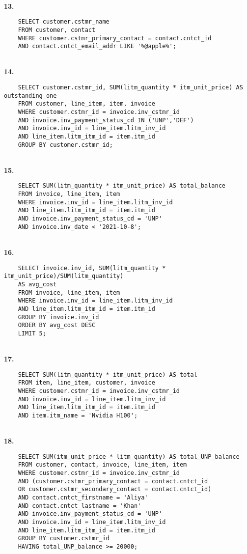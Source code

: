 \documentclass[letterpaper,11pt]{article}
\newcommand{\Paragraph}[1]{~\vspace*{-0.7\baselineskip}\\{\bf #1}}
\begin{document}
\Paragraph{13. }
\begin{verbatim}
	SELECT customer.cstmr_name
	FROM customer, contact
	WHERE customer.cstmr_primary_contact = contact.cntct_id
	AND contact.cntct_email_addr LIKE '%@apple%';
\end{verbatim}

\Paragraph{14.}
\begin{verbatim}
	SELECT customer.cstmr_id, SUM(litm_quantity * itm_unit_price) AS outstanding_one
	FROM customer, line_item, item, invoice
	WHERE customer.cstmr_id = invoice.inv_cstmr_id
	AND invoice.inv_payment_status_cd IN ('UNP','DEF')
	AND invoice.inv_id = line_item.litm_inv_id
	AND line_item.litm_itm_id = item.itm_id
	GROUP BY customer.cstmr_id;
\end{verbatim}

\Paragraph{15.}
\begin{verbatim}
	SELECT SUM(litm_quantity * itm_unit_price) AS total_balance
	FROM invoice, line_item, item
	WHERE invoice.inv_id = line_item.litm_inv_id
	AND line_item.litm_itm_id = item.itm_id
	AND invoice.inv_payment_status_cd = 'UNP'
	AND invoice.inv_date < '2021-10-8';
\end{verbatim}

\newpage
\Paragraph{16. }
\begin{verbatim}
	SELECT invoice.inv_id, SUM(litm_quantity * itm_unit_price)/SUM(litm_quantity) 
	AS avg_cost
	FROM invoice, line_item, item
	WHERE invoice.inv_id = line_item.litm_inv_id
	AND line_item.litm_itm_id = item.itm_id
	GROUP BY invoice.inv_id
	ORDER BY avg_cost DESC
	LIMIT 5;
\end{verbatim}

\Paragraph{17.}
\begin{verbatim}
	SELECT SUM(litm_quantity * itm_unit_price) AS total
	FROM item, line_item, customer, invoice
	WHERE customer.cstmr_id = invoice.inv_cstmr_id
	AND invoice.inv_id = line_item.litm_inv_id
	AND line_item.litm_itm_id = item.itm_id
	AND item.itm_name = 'Nvidia H100';
\end{verbatim}


\Paragraph{18.}
\begin{verbatim}
	SELECT SUM(itm_unit_price * litm_quantity) AS total_UNP_balance
	FROM customer, contact, invoice, line_item, item
	WHERE customer.cstmr_id = invoice.inv_cstmr_id
	AND (customer.cstmr_primary_contact = contact.cntct_id 
	OR customer.cstmr_secondary_contact = contact.cntct_id)
	AND contact.cntct_firstname = 'Aliya' 
	AND contact.cntct_lastname = 'Khan'
	AND invoice.inv_payment_status_cd = 'UNP'
	AND invoice.inv_id = line_item.litm_inv_id
	AND line_item.litm_itm_id = item.itm_id
	GROUP BY customer.cstmr_id
	HAVING total_UNP_balance >= 20000;
\end{verbatim}
\end{document}
